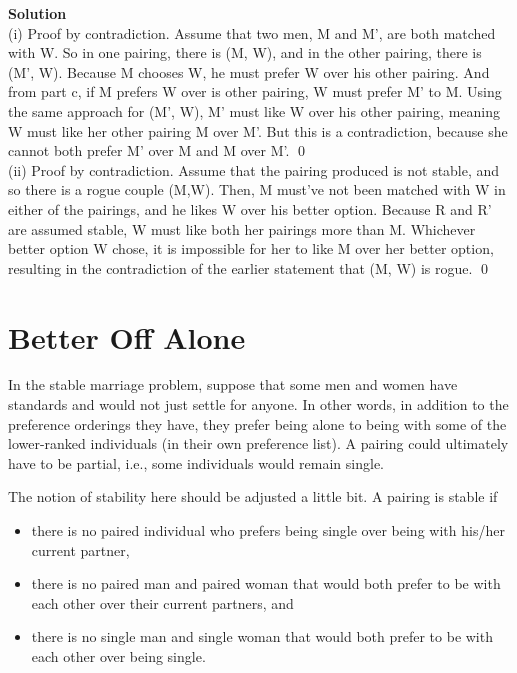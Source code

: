 \documentclass[11pt]{article}
\newcommand*{\Question}[1]{\section{#1}}
\newenvironment{Parts}{\begin{enumerate}[label=(\alph*)]}{\end{enumerate}}
\begin{document}
\begin{Parts}
\begin{mdframed} \textbf{Solution} \\
(i) Proof by contradiction. Assume that two men, M and M', are both matched with W. So in one pairing, there is (M, W), and in the other pairing, there is (M', W). Because M chooses W, he must prefer W over his other pairing. And from part c, if M prefers W over is other pairing, W must prefer M' to M. Using the same approach for (M', W), M' must like W over his other pairing, meaning W must like her other pairing M over M'. But this is a contradiction, because she cannot both prefer M' over M and M over M'. \qed \\
(ii) Proof by contradiction. Assume that the pairing produced is not stable, and so there is a rogue couple (M,W). Then, M must've not been matched with W in either of the pairings, and he likes W over his better option. Because R and R' are assumed stable, W must like both her pairings more than M. Whichever better option W chose, it is impossible for her to like M over her better option, resulting in the contradiction of the earlier statement that (M, W) is rogue. \qed
\end{mdframed}

\end{Parts}



\Question{Better Off Alone}

In the stable marriage problem, suppose that some men and women have standards and would not just settle
for anyone. In other words, in addition to the preference orderings they have,
they prefer being alone to being with some of the lower-ranked individuals
(in their own preference list). A pairing could ultimately have to be partial, i.e., some individuals would
remain single.

The notion of stability here should
be adjusted a little bit. A pairing is stable if
\begin{itemize}
\item there is no paired individual who prefers being single over being with his/her current partner,
\item there is no paired man and paired woman that would both prefer to be with each other over their current partners, and
\item there is no single man and single woman that would both prefer to be with each other over being single. 
\end{itemize} 
\end{document}
